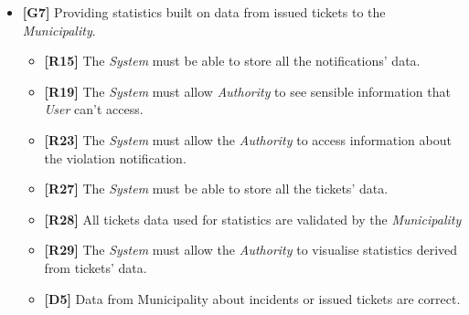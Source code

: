 \documentclass {article}
\begin{document}
\begin{itemize}
\begin{itemize}
			  \item {\bf [R15]} The {\it System} must be able to store all the notifications' data.
   		      \item {\bf [R19]} The {\it System} must allow {\it Authority} to see sensible information that {\it User} can't access.
			  \item {\bf [R23]} The {\it System} must allow the {\it Authority} to access information about the violation notification.
			  \item {\bf [R24]} The {\it System} must allow the {\it Authority} to validate a ticket.
			  \item {\bf [R25]} The {\it System} must allow the {\it Authority} to access sensible data about the violation.
			  \item {\bf [R26]} The {\it System} must inform the {\it Authority} that the violation details process is done correctly. 
			  \item {\bf [D5]} Data from Municipality about incidents or issued tickets are correct.
			  \item {\bf [D9]} Municipality is entitled to issue tickets even if the violation is not physically acknowledged.
			  \end{itemize}
			  \item {\bf [G7]} Providing statistics built on data from issued tickets to the {\it Municipality}.		
			  \begin{itemize}
			  \item {\bf [R15]} The {\it System} must be able to store all the notifications' data.
			  \item {\bf [R19]} The {\it System} must allow {\it Authority} to see sensible information that {\it User} can't access.
			  \item {\bf [R23]} The {\it System} must allow the {\it Authority} to access information about the violation notification.
			  \item {\bf [R27]} The {\it System} must be able to store all the tickets' data.
			  \item {\bf [R28]} All tickets data used for statistics are validated by the {\it Municipality}
			  \item {\bf [R29]} The {\it System} must allow the {\it Authority} to visualise statistics derived from tickets' data.
			  \item {\bf [D5]} Data from Municipality about incidents or issued tickets are correct.
			  \end{itemize}
	\end{itemize}
	\pagebreak
\end{document}

